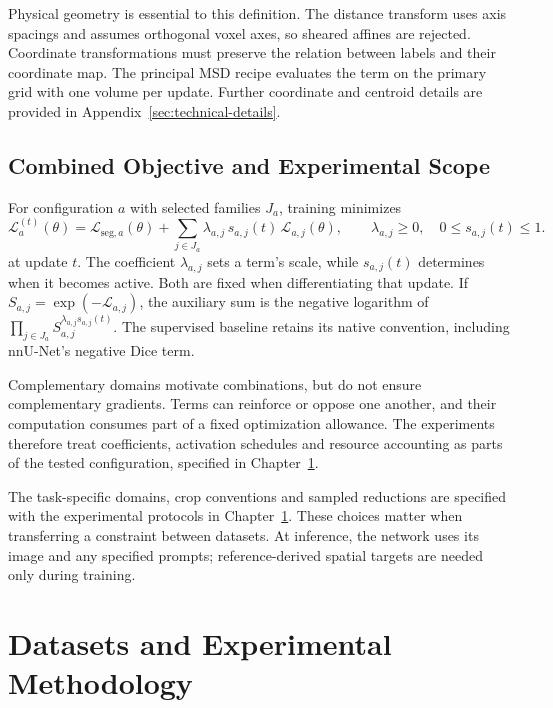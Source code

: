 \documentclass[12pt,a4paper]{article}
\begin{document}
Physical geometry is essential to this definition. The distance
transform uses axis spacings and assumes orthogonal voxel axes,
so sheared affines are rejected. Coordinate transformations must
preserve the relation between labels and their coordinate map.
The principal MSD recipe evaluates the term on the primary grid
with one volume per update. Further coordinate and centroid details
are provided in Appendix~\ref{sec:technical-details}.

\subsection{Combined Objective and Experimental Scope}
\label{sec:constraint-combination}

For configuration $a$ with selected families $J_a$, training minimizes
\begin{equation}
\mathcal{L}_{a}^{(t)}(\theta)
=\mathcal{L}_{\mathrm{seg},a}(\theta)
+\sum_{j\in J_a}\lambda_{a,j}\,s_{a,j}(t)\,
\mathcal{L}_{a,j}(\theta),
\qquad \lambda_{a,j}\geq0,\quad 0\leq s_{a,j}(t)\leq1.
\label{eq:scheduled-constraint-objective}
\end{equation}
at update $t$. The coefficient $\lambda_{a,j}$ sets a term's scale,
while $s_{a,j}(t)$ determines when it becomes active. Both are fixed
when differentiating that update. If
$S_{a,j}=\exp(-\mathcal L_{a,j})$, the auxiliary sum is the negative
logarithm of
$\prod_{j\in J_a}S_{a,j}^{\lambda_{a,j}s_{a,j}(t)}$.
The supervised baseline retains its native convention, including
nnU-Net's negative Dice term.

Complementary domains motivate combinations, but do not ensure
complementary gradients. Terms can reinforce or oppose one another,
and their computation consumes part of a fixed optimization allowance.
The experiments therefore treat coefficients, activation schedules
and resource accounting as parts of the tested configuration,
specified in Chapter~\ref{sec:methodology}.

The task-specific domains, crop conventions and sampled reductions
are specified with the experimental protocols in
Chapter~\ref{sec:methodology}. These choices matter when transferring a
constraint between datasets. At inference, the network uses its image
and any specified prompts; reference-derived spatial targets are needed
only during training.

\clearpage
\section{Datasets and Experimental Methodology}
\label{sec:methodology}
\end{document}

